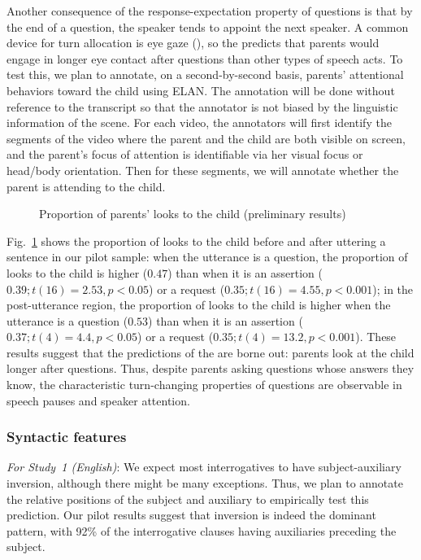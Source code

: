 Another consequence of the response-expectation property of questions is that by the end of a question, the speaker tends to appoint the next speaker. A common device for turn allocation is eye gaze (\citealt{argyle1972gaze, kendon1967gaze,duncan1979gaze, rossano2009gaze}), so the \hypos{} predicts that parents would engage in longer eye contact after questions than other types of speech acts. To test this, we plan to annotate, on a second-by-second basis, parents' attentional behaviors toward the child using ELAN. The annotation will be done without reference to the transcript so that the annotator is not biased by the linguistic information of the scene. For each video, the annotators will first identify the segments of the video where the parent and the child are both visible on screen, and the parent’s focus of attention is identifiable via her visual focus or head/body orientation. Then for these segments, we will annotate whether the parent is attending to the child.  


\begin{figure}[H]
\label{fg:attention}
\begin{center}
	\vspace{-6ex}
	\caption{Proportion of parents' looks to the child (preliminary results)}
\end{center}
\end{figure}


Fig.~\ref{fg:attention} shows the proportion of looks to the child before and after uttering a sentence in our pilot sample: when the utterance is a question, the proportion of looks to the child is higher ($0.47$) than when it is an assertion ($0.39; t(16) = 2.53, p <0.05$) or a request ($0.35; t(16)= 4.55, p<0.001$); in the post-utterance region, the proportion of looks to the child is higher when the utterance is a question ($0.53$) than when it is an assertion ($0.37; t(4) = 4.4, p<0.05$) or a request ($0.35; t(4) = 13.2, p<0.001$). These results suggest that the predictions of the \hypos{} are borne out: parents look at the child longer after questions. Thus, despite parents asking questions whose answers they know, the characteristic turn-changing properties of questions are observable in speech pauses and speaker attention. 



\subsubsection{Syntactic features}\label{prop-code:syn}
 \noindent\emph{For Study~1 (English)}:
We expect most interrogatives to have subject-auxiliary inversion, although there might be many exceptions. Thus, we plan to annotate the relative positions of the subject and auxiliary to empirically test this prediction. Our pilot results suggest that inversion is indeed the dominant pattern, with 92\% of the interrogative clauses having auxiliaries preceding the subject. 